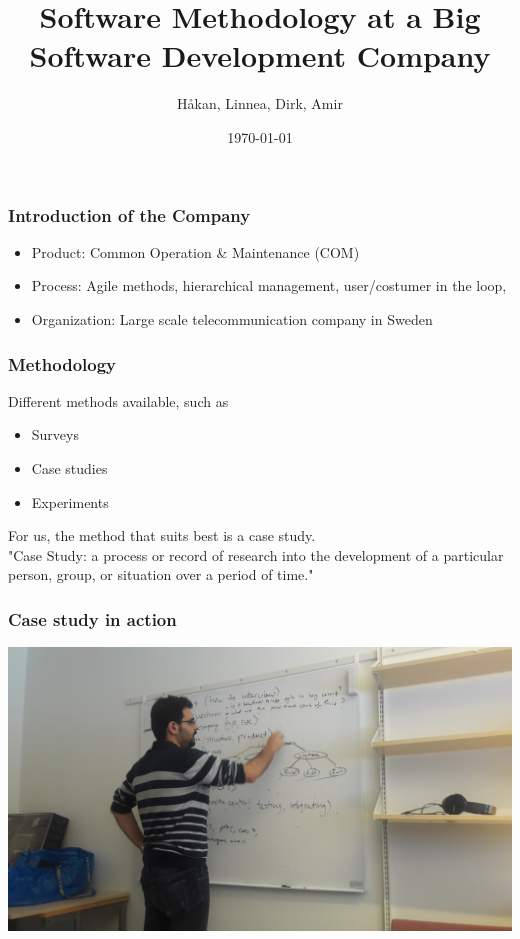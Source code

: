 \documentclass{beamer}
\begin{document}



\title{Software Methodology at a Big Software Development Company}
\author{H\aa kan, Linnea, Dirk, Amir}

\date{\today}

\begin{frame}
\titlepage
\end{frame}

\begin{frame}\frametitle{Introduction of the Company}
\begin{itemize}
\item Product: Common Operation \& Maintenance (COM)
\item Process: Agile methods, hierarchical management, user/costumer in the loop,
\item Organization: Large scale telecommunication company in Sweden
\end{itemize}
\end{frame}

\begin{frame}
  \frametitle{Methodology}
  Different methods available, such as
  \begin{itemize}
  \item Surveys
   \item Case studies
   \item Experiments
  \end{itemize}
  For us, the method that suits best is a case study.\\
  "Case Study: a process or record of research into the development of a particular person, group, or situation over a period of time."
\end{frame}

\begin{frame}
  \frametitle{Case study in action}
  \begin{center}
    \includegraphics[width=1\textwidth]{figs/amir.jpg}
  \end{center}
\end{frame}
\end{document}
